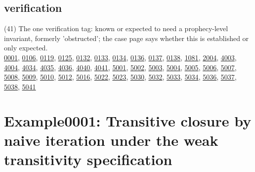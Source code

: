 \documentclass[10pt]{article}
\begin{document}
\subsection*{verification}
\begin{description}[leftmargin=1.2em,itemsep=2pt]
\item[\texttt{prophecy}\label{tag:prophecy}] (41) The one verification tag: known or expected to need a prophecy-level invariant, formerly 'obstructed'; the case page says whether this is established or only expected.\\ {\small \hyperref[case:Example0001]{0001}, \hyperref[case:Example0106]{0106}, \hyperref[case:Example0119]{0119}, \hyperref[case:Example0125]{0125}, \hyperref[case:Example0132]{0132}, \hyperref[case:Example0133]{0133}, \hyperref[case:Example0134]{0134}, \hyperref[case:Example0136]{0136}, \hyperref[case:Example0137]{0137}, \hyperref[case:Example0138]{0138}, \hyperref[case:Example1081]{1081}, \hyperref[case:Example2004]{2004}, \hyperref[case:Example4003]{4003}, \hyperref[case:Example4004]{4004}, \hyperref[case:Example4034]{4034}, \hyperref[case:Example4035]{4035}, \hyperref[case:Example4036]{4036}, \hyperref[case:Example4040]{4040}, \hyperref[case:Example4041]{4041}, \hyperref[case:Example5001]{5001}, \hyperref[case:Example5002]{5002}, \hyperref[case:Example5003]{5003}, \hyperref[case:Example5004]{5004}, \hyperref[case:Example5005]{5005}, \hyperref[case:Example5006]{5006}, \hyperref[case:Example5007]{5007}, \hyperref[case:Example5008]{5008}, \hyperref[case:Example5009]{5009}, \hyperref[case:Example5010]{5010}, \hyperref[case:Example5012]{5012}, \hyperref[case:Example5016]{5016}, \hyperref[case:Example5022]{5022}, \hyperref[case:Example5023]{5023}, \hyperref[case:Example5030]{5030}, \hyperref[case:Example5032]{5032}, \hyperref[case:Example5033]{5033}, \hyperref[case:Example5034]{5034}, \hyperref[case:Example5036]{5036}, \hyperref[case:Example5037]{5037}, \hyperref[case:Example5038]{5038}, \hyperref[case:Example5041]{5041}}
\end{description}

\clearpage

\Needspace{0.45\textheight}

\section{Example0001: Transitive closure by naive iteration under the weak transitivity specification}\label{case:Example0001}
\end{document}
